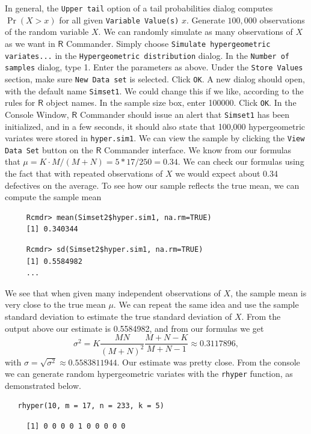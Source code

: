 \documentclass[captions=tableheading]{scrbook}
\begin{document}
\begin{example}
   In general, the \texttt{Upper tail} option of a tail probabilities dialog computes \(\Pr(X > x)\) for all given \texttt{Variable Value(s)} \(x\).
Generate \(100,000\) observations of the random variable \(X\).
   We can randomly simulate as many observations of \(X\) as we want in \(\mathsf{R}\) Commander. Simply choose \texttt{Simulate hypergeometric variates...} in the \texttt{Hypergeometric distribution} dialog. 
   In the \texttt{Number of samples} dialog, type 1. Enter the parameters as above. Under the \texttt{Store Values} section, make sure \texttt{New Data set} is selected. Click \texttt{OK}. 
   A new dialog should open, with the default name \texttt{Simset1}.  We could change this if we like, according to the rules for \(\mathsf{R}\) object names. In the sample size box, enter 100000. Click \texttt{OK}. 
   In the Console Window, \(\mathsf{R}\) Commander should issue an alert that \texttt{Simset1} has been initialized, and in a few seconds, it should also state that 100,000 hypergeometric variates were stored in \texttt{hyper.sim1}. We can view the sample by clicking the \texttt{View Data Set} button on the \(\mathsf{R}\) Commander interface.
   We know from our formulas that \(\mu=K\cdot M/(M+N)=5*17/250=0.34\). We can check our formulas using the fact that with repeated observations of \(X\) we would expect about 0.34 defectives on the average. To see how our sample reflects the true mean, we can compute the sample mean
\begin{verbatim}
     Rcmdr> mean(Simset2$hyper.sim1, na.rm=TRUE)
     [1] 0.340344
\end{verbatim}
   
\begin{verbatim}
     Rcmdr> sd(Simset2$hyper.sim1, na.rm=TRUE)
     [1] 0.5584982
     ...
\end{verbatim}
   We see that when given many independent observations of \(X\), the sample mean is very close to the true mean \(\mu\). We can repeat the same idea and use the sample standard deviation to estimate the true standard deviation of \(X\). From the output above our estimate is 0.5584982, and from our formulas we get
   \[
   \sigma^{2}=K\frac{MN}{(M+N)^{2}}\frac{M+N-K}{M+N-1}\approx0.3117896,
   \]
   with \(\sigma=\sqrt{\sigma^{2}}\approx0.5583811944\). Our estimate was pretty close.
   From the console we can generate random hypergeometric variates with the \texttt{rhyper} function, as demonstrated below.


\begin{verbatim}
   rhyper(10, m = 17, n = 233, k = 5)
\end{verbatim}

\begin{verbatim}
     [1] 0 0 0 0 1 0 0 0 0 0
\end{verbatim}

\end{example}
\end{document}

